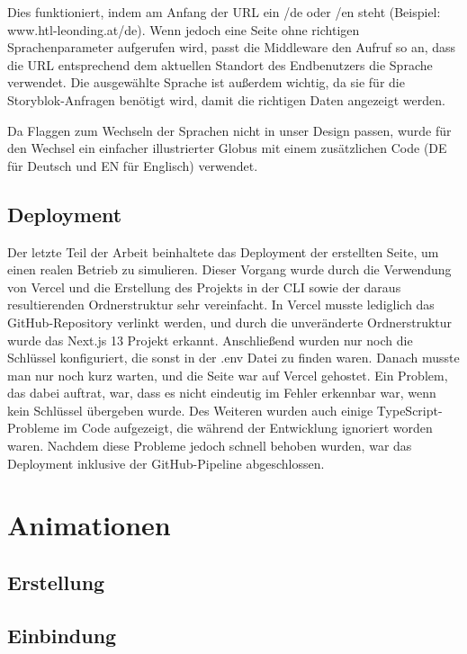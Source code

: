 Dies funktioniert, indem am Anfang der URL ein /de oder /en steht (Beispiel: www.htl-leonding.at/de). 
Wenn jedoch eine Seite ohne richtigen Sprachenparameter aufgerufen wird, passt die Middleware den Aufruf so an, dass die URL entsprechend dem aktuellen Standort des Endbenutzers die Sprache verwendet. 
Die ausgewählte Sprache ist außerdem wichtig, da sie für die Storyblok-Anfragen benötigt wird, damit die richtigen Daten angezeigt werden.

Da Flaggen zum Wechseln der Sprachen nicht in unser Design passen, wurde für den Wechsel ein einfacher illustrierter Globus mit einem zusätzlichen Code (DE für Deutsch und EN für Englisch) verwendet.

\subsection{Deployment}

Der letzte Teil der Arbeit beinhaltete das Deployment der erstellten Seite, um einen realen Betrieb zu simulieren. Dieser Vorgang wurde durch die Verwendung von Vercel und die Erstellung des Projekts in der CLI sowie der daraus resultierenden Ordnerstruktur sehr vereinfacht. In Vercel musste lediglich das GitHub-Repository verlinkt werden, und durch die unveränderte Ordnerstruktur wurde das Next.js 13 Projekt erkannt. Anschließend wurden nur noch die Schlüssel konfiguriert, die sonst in der .env Datei zu finden waren. Danach musste man nur noch kurz warten, und die Seite war auf Vercel gehostet. Ein Problem, das dabei auftrat, war, dass es nicht eindeutig im Fehler erkennbar war, wenn kein Schlüssel übergeben wurde. Des Weiteren wurden auch einige TypeScript-Probleme im Code aufgezeigt, die während der Entwicklung ignoriert worden waren. Nachdem diese Probleme jedoch schnell behoben wurden, war das Deployment inklusive der GitHub-Pipeline abgeschlossen.

\section{Animationen}

\subsection{Erstellung}

\subsection{Einbindung}



